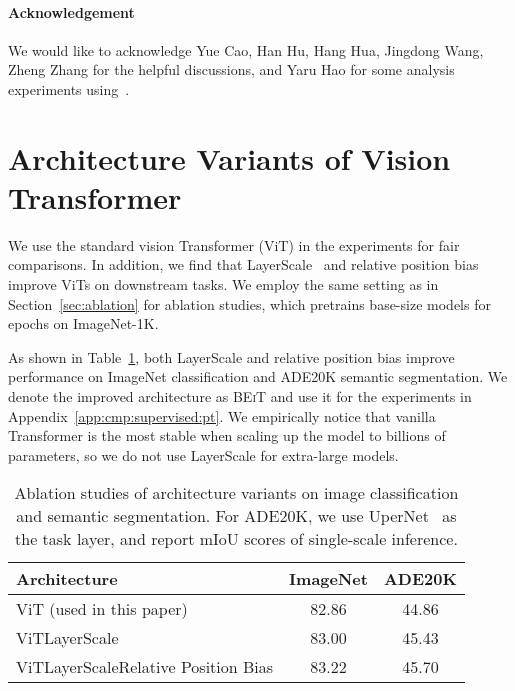 \documentclass{article}
\newcommand\our{\textsc{BEiT}}
\begin{document}
\paragraph{Acknowledgement}
We would like to acknowledge Yue Cao, Han Hu, Hang Hua, Jingdong Wang, Zheng Zhang for the helpful discussions, and Yaru Hao for some analysis experiments using~\citep{hao2020self}.






\newpage
\appendix


\section{Architecture Variants of Vision Transformer}
\label{app:arch:variants}

We use the standard vision Transformer (ViT) in the experiments for fair comparisons.
In addition, we find that LayerScale~\citep{cait} and relative position bias~\citep{unilm2,t5} improve ViTs on downstream tasks.
We employ the same setting as in Section~\ref{sec:ablation} for ablation studies, which pretrains base-size models for  epochs on ImageNet-1K.

As shown in Table~\ref{tbl:arch_ablation}, both LayerScale and relative position bias improve performance on ImageNet classification and ADE20K semantic segmentation.
We denote the improved architecture as \our{} and use it for the experiments in Appendix~\ref{app:cmp:supervised:pt}.
We empirically notice that vanilla Transformer is the most stable when scaling up the model to billions of parameters, so we do not use LayerScale for extra-large models.


\begin{table}[H]
\centering
\begin{tabular}{lcc}
\toprule
\textbf{Architecture} & \bf ImageNet & \bf ADE20K \\ \midrule
ViT (used in this paper) & 82.86 & 44.86 \\ 
ViTLayerScale & 83.00 & 45.43 \\
ViTLayerScaleRelative Position Bias & 83.22 & 45.70 \\
\bottomrule
\end{tabular}
\caption{
Ablation studies of architecture variants on image classification and semantic segmentation.
For ADE20K, we use UperNet~\citep{upernet} as the task layer, and report mIoU scores of single-scale inference.
}
\label{tbl:arch_ablation}
\end{table}
\end{document}
